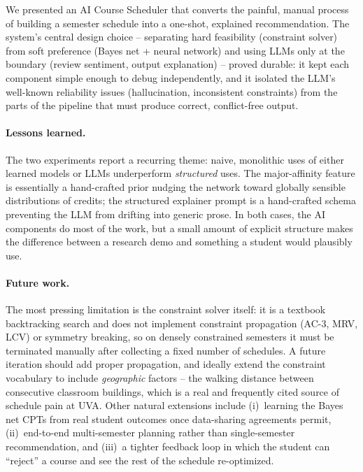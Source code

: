 \documentclass[10pt,letterpaper]{article}
\begin{document}
We presented an AI Course Scheduler that converts the painful, manual
process of building a semester schedule into a one-shot, explained
recommendation. The system's central design choice -- separating hard
feasibility (constraint solver) from soft preference (Bayes net + neural
network) and using LLMs only at the boundary (review sentiment, output
explanation) -- proved durable: it kept each component simple enough to
debug independently, and it isolated the LLM's well-known reliability
issues (hallucination, inconsistent constraints) from the parts of the
pipeline that must produce correct, conflict-free output.

\paragraph{Lessons learned.} The two experiments report a recurring theme:
naive, monolithic uses of either learned models or LLMs underperform
\emph{structured} uses. The major-affinity feature is essentially a
hand-crafted prior nudging the network toward globally sensible
distributions of credits; the structured explainer prompt is a hand-crafted
schema preventing the LLM from drifting into generic prose. In both cases,
the AI components do most of the work, but a small amount of explicit
structure makes the difference between a research demo and something a
student would plausibly use.

\paragraph{Future work.} The most pressing limitation is the constraint
solver itself: it is a textbook backtracking search and does not implement
constraint propagation (AC-3, MRV, LCV) or symmetry breaking, so on densely
constrained semesters it must be terminated manually after collecting a
fixed number of schedules. A future iteration should add proper
propagation, and ideally extend the constraint vocabulary to include
\emph{geographic} factors -- the walking distance between consecutive
classroom buildings, which is a real and frequently cited source of
schedule pain at UVA. Other natural extensions include (i)~learning the
Bayes net CPTs from real student outcomes once data-sharing agreements
permit, (ii)~end-to-end multi-semester planning rather than single-semester
recommendation, and (iii)~a tighter feedback loop in which the student can
``reject'' a course and see the rest of the schedule re-optimized.

\end{document}
